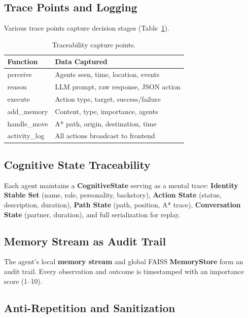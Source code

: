 \documentclass[10pt,conference]{IEEEtran}
\begin{document}
\subsection{Trace Points and Logging}

Various trace points capture decision stages (Table~\ref{tab:trace}).

\begin{table}[ht]
\centering
\caption{Traceability capture points.}
\label{tab:trace}
\scriptsize
\begin{tabular}{@{}ll@{}}
\toprule
\textbf{Function} & \textbf{Data Captured} \\
\midrule
perceive     & Agents seen, time, location, events \\
reason       & LLM prompt, raw response, JSON action \\
execute      & Action type, target, success/failure \\
add\_memory  & Content, type, importance, agents \\
handle\_move & A* path, origin, destination, time \\
activity\_log & All actions broadcast to frontend \\
\bottomrule
\end{tabular}
\end{table}

\subsection{Cognitive State Traceability}

Each agent maintains a \textbf{CognitiveState} serving as a mental trace: \textbf{Identity Stable Set} (name, role, personality, backstory), \textbf{Action State} (status, description, duration), \textbf{Path State} (path, position, A* trace), \textbf{Conversation State} (partner, duration), and full serialization for replay.

\subsection{Memory Stream as Audit Trail}

The agent's local \textbf{memory stream} and global FAISS \textbf{MemoryStore} form an audit trail. Every observation and outcome is timestamped with an importance score (1--10).

\subsection{Anti-Repetition and Sanitization}
\end{document}
